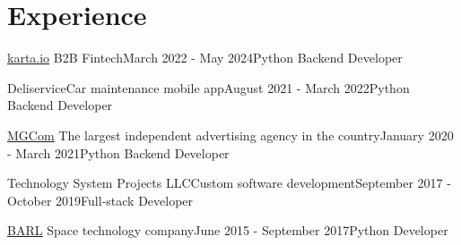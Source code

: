 \section{Experience}

\begin{experienceEntry}
{\href{https://karta.io}{\underline{karta.io}}}
{B2B Fintech}{March 2022 - May 2024}{Python Backend Developer}
    {}
\end{experienceEntry}

\vspace{1em}

\begin{experienceEntry}{Deliservice}{Car maintenance mobile app}{August 2021 - March 2022}{Python Backend Developer}
    {}
\end{experienceEntry}

\vspace{1em}

\begin{experienceEntry}
{\href{https://mgcom.ru}{\underline{MGCom}}}
{The largest independent advertising agency in the country}{January 2020 - March 2021}{Python Backend Developer}
    {}
\end{experienceEntry}

\vspace{1em}

\begin{experienceEntry}{Technology System Projects LLC}{Custom software development}{September 2017 - October 2019}{Full-stack Developer}
    {}
\end{experienceEntry}

\vspace{1em}

\begin{experienceEntry}
{\href{https://barl.ru}{\underline{BARL}}}
{Space technology company}{June 2015 - September 2017}{Python Developer}
    {}
\end{experienceEntry}

